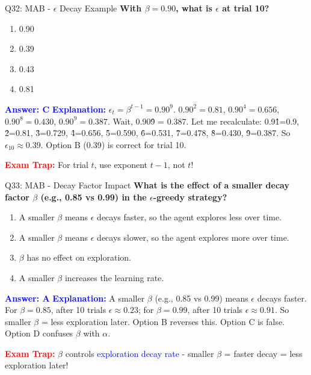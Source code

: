 \documentclass[8pt]{beamer}
\begin{document}
	\begin{frame}{Q32: MAB - $\epsilon$ Decay Example}
		\fontsize{6.5}{7.5}\selectfont
		\textbf{With $\beta = 0.90$, what is $\epsilon$ at trial 10?}
		
		\begin{enumerate}
			\item 0.90
			\item 0.39
			\item 0.43
			\item 0.81
		\end{enumerate}
		
		\vspace{0.1cm}
		\textcolor{blue}{\textbf{Answer: C}}
		\vspace{0.1cm}
		\textcolor{blue}{\textbf{Explanation:}} $\epsilon_t = \beta^{t-1} = 0.90^{9}$. $0.90^2 = 0.81$, $0.90^4 = 0.656$, $0.90^8 = 0.430$, $0.90^9 = 0.387$. Wait, 0.90\^9 = 0.387. Let me recalculate: 0.9\^1=0.9, \^2=0.81, \^3=0.729, \^4=0.656, \^5=0.590, \^6=0.531, \^7=0.478, \^8=0.430, \^9=0.387. So $\epsilon_{10} \approx 0.39$. Option B (0.39) is correct for trial 10.
		
		\textcolor{red}{\textbf{Exam Trap:}} For trial $t$, use exponent $t-1$, not $t$!
	\end{frame}
	
	\begin{frame}{Q33: MAB - Decay Factor Impact}
		\fontsize{6.5}{7.5}\selectfont
		\textbf{What is the effect of a smaller decay factor $\beta$ (e.g., 0.85 vs 0.99) in the $\epsilon$-greedy strategy?}
		
		\begin{enumerate}
			\item A smaller $\beta$ means $\epsilon$ decays faster, so the agent explores less over time.
			\item A smaller $\beta$ means $\epsilon$ decays slower, so the agent explores more over time.
			\item $\beta$ has no effect on exploration.
			\item A smaller $\beta$ increases the learning rate.
		\end{enumerate}
		
		\vspace{0.1cm}
		\textcolor{blue}{\textbf{Answer: A}}
		\vspace{0.1cm}
		\textcolor{blue}{\textbf{Explanation:}} A smaller $\beta$ (e.g., 0.85 vs 0.99) means $\epsilon$ decays faster. For $\beta=0.85$, after 10 trials $\epsilon \approx 0.23$; for $\beta=0.99$, after 10 trials $\epsilon \approx 0.91$. So smaller $\beta$ = less exploration later. Option B reverses this. Option C is false. Option D confuses $\beta$ with $\alpha$.
		
		\textcolor{red}{\textbf{Exam Trap:}} $\beta$ controls \textcolor{blue}{exploration decay rate} - smaller $\beta$ = faster decay = less exploration later!
	\end{frame}
	
\end{document}
